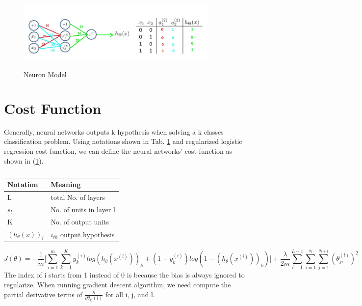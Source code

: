 \documentclass{article}
\begin{document}
\begin{figure}[ht]
  \centering
  \includegraphics[width=10cm]{Figure6.jpg}\\
  \caption{Neuron Model}\label{XOR_neural_networks}
\end{figure}
\section{Cost Function}
Generally, neural networks outputs k hypothesis when solving a k classes classification problem. Using notations shown in Tab. \ref{neural_networks_cost_function_notation} and regularized logistic regression cost function, we can define the neural networks' cost function as shown in (\ref{}).
\begin{table}[hb]
\begin{center}
\caption{}\label{neural_networks_cost_function_notation}
\begin{tabular}{l|l}
\hline
Notation & Meaning\\
\hline
L   & total No. of layers\\
$s_{l}$ & No. of units in layer l\\
K   & No. of output units \\
$(h_{\theta}(x))_{i}$ & $i_{th}$ output hypothesis\\
\hline
\end{tabular}
\end{center}
\end{table}
\begin{equation}\label{neural_networks_cost_function}
J(\theta) = -\frac{1}{m}\biggl[\sum_{i=1}^{m}\sum_{k=1}^{K} y_{k}^{(i)}log(h_{\theta}(x^{(i)}))_{k} + (1 - y_{k}^{(i)})log(1 - (h_{\theta}(x^{(i)}))_{k})\biggr] + \frac{\lambda}{2m}\sum_{l=1}^{L-1}\sum_{i=1}^{s_{l}}\sum_{j=1}^{s_{l+1}}(\theta_{ji}^{(l)})^{2}
\end{equation}
The index of i starts from 1 instead of 0 is because the bias is always ignored to regularize. When running gradient descent algorithm, we need compute the partial derivative terms of $\frac{\partial}{\partial \theta_{ij}{(l)}}$ for all i, j, and l.
\end{document}
